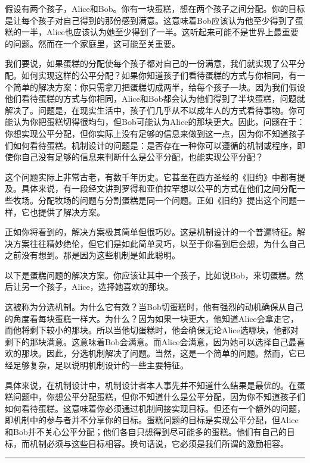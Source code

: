 \documentclass[12pt,a4paper]{article}
\newenvironment{translation}{%
  \par\vspace{2pt}\noindent%
  \color{transblue}%
  \ignorespaces
}{%
  \par\vspace{4pt}\hrule\vspace{6pt}%
}
\begin{document}
\begin{translation}
假设有两个孩子，Alice和Bob。你有一块蛋糕，想在两个孩子之间分配。你的目标是让每个孩子对自己得到的那份感到满意。这意味着Bob应该认为他至少得到了蛋糕的一半，Alice也应该认为她至少得到了一半。这听起来可能不是世界上最重要的问题。然而在一个家庭里，这可能至关重要。

我们要说，如果蛋糕的分配使每个孩子都对自己的一份满意，我们就实现了公平分配。如何实现这样的公平分配？如果你知道孩子们看待蛋糕的方式与你相同，有一个简单的解决方案：你只需拿刀把蛋糕切成两半，给每个孩子一块。因为我们假设他们看待蛋糕的方式与你相同，Alice和Bob都会认为他们得到了半块蛋糕，问题就解决了。问题是，在现实生活中，孩子们几乎从不以成年人的方式看待事物。你可能认为你把蛋糕切得很均匀，但Bob可能认为Alice的那块更大。因此，问题在于：你想实现公平分配，但你实际上没有足够的信息来做到这一点，因为你不知道孩子们如何看待蛋糕。机制设计的问题是：是否存在一种你可以遵循的机制或程序，即使你自己没有足够的信息来判断什么是公平分配，也能实现公平分配？

这个问题实际上非常古老，有数千年历史。它甚至在西方圣经的《旧约》中都有提及。具体来说，有一段经文讲到罗得和亚伯拉罕想以公平的方式在他们之间分配一些牧场。分配牧场的问题与分割蛋糕是同一个问题。正如《旧约》提出这个问题一样，它也提供了解决方案。

正如你将看到的，解决方案极其简单但很巧妙。这是机制设计的一个普遍特征。解决方案往往精妙绝伦，但它们是如此简单灵巧，以至于你看到后会想，为什么自己之前没有想到。那是因为这些机制是如此聪明。

以下是蛋糕问题的解决方案。你应该让其中一个孩子，比如说Bob，来切蛋糕。然后让另一个孩子，Alice，选择她喜欢的那块。

这被称为分选机制。为什么它有效？当Bob切蛋糕时，他有强烈的动机确保从自己的角度看每块蛋糕一样大。为什么？因为如果一块更大，他知道Alice会拿走它，而他将剩下较小的那块。所以当他切蛋糕时，他会确保无论Alice选哪块，他都对剩下的那块满意。这意味着Bob会满意。而Alice会满意，因为她可以选择自己最喜欢的那块。因此，分选机制解决了问题。当然，这是一个简单的问题。然而，它已经足够复杂，足以说明机制设计的一些主要特征。

具体来说，在机制设计中，机制设计者本人事先并不知道什么结果是最优的。在蛋糕问题中，你想公平分配蛋糕，但你不知道什么是公平分配，因为你不知道孩子们如何看待蛋糕。这意味着你必须通过机制间接实现目标。但还有一个额外的问题，即机制中的参与者并不分享你的目标。蛋糕问题的目标是实现公平分配，但Alice和Bob并不关心公平分配；他们各自只想得到尽可能多的蛋糕。他们有自己的目标，而机制必须与这些目标相容。换句话说，它必须是我们所谓的激励相容。
\end{translation}
\end{document}

